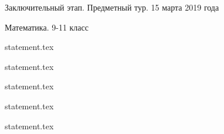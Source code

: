 \documentclass[a4paper,11pt, oneside]{book}
\begin{document}
\vspace{-3mm}
\vspace{-5mm}

\normalsize

\begin{center}
    Заключительный этап. Предметный тур. 15 марта 2019 года
    
    Математика. 9-11 класс
\end{center}

\parindent=0cm

{statement.tex}

{statement.tex}

{statement.tex}

\clearpage

{statement.tex}

{statement.tex}
\end{document}
